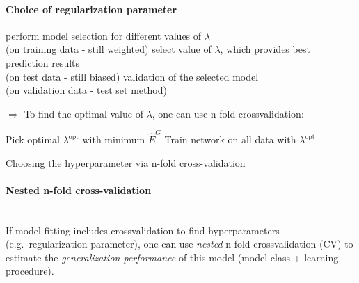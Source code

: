 \paragraph{Choice of regularization parameter}
\begin{itemize}
	\itr perform model selection for different values of $\lambda$\\
        (on training data - still weighted)
	\itr select value of $\lambda$, which provides best prediction results\\
	(on test data - still biased)
	\itr validation of the selected model\\
        (on validation data - test set method)
\end{itemize}
$\Rightarrow$ To find the optimal value of $\lambda$, one can use n-fold crossvalidation:
\begin{algorithm}[h]
\DontPrintSemicolon
{}
Pick optimal $\lambda^{\text{opt}}$ with minimum $\widehat{E}^G$\;\;
Train network on all data with $\lambda^{\text{opt}}$ 
\;\;
\caption{Choosing the hyperparameter via n-fold cross-validation}
\end{algorithm}

\paragraph{Nested n-fold cross-validation}\mbox{}\\
If model fitting includes crossvalidation to find hyperparameters
(e.g.\ regularization parameter), one can use \emph{nested} n-fold
crossvalidation (CV) to estimate the \emph{generalization performance} of this
model (model class + learning procedure).

